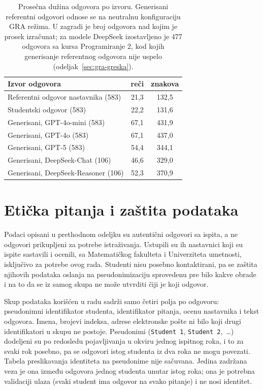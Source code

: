 \begin{table}[ht]
\centering
\caption{Prosečna dužina odgovora po izvoru.
Generisani referentni odgovori odnose se na neutralnu konfiguraciju GRA režima.
U zagradi je broj odgovora nad kojim je prosek izračunat;
za modele DeepSeek izostavljeno je 477 odgovora sa kursa Programiranje 2,
kod kojih generisanje referentnog odgovora nije uspelo (odeljak~\ref{sec:gra-greska}).}
\label{tab:response_length}
\begin{tabular}{lcc}
\toprule
\textbf{Izvor odgovora} & \textbf{reči} & \textbf{znakova} \\
\midrule
Referentni odgovor nastavnika (583) & 21{,}3 & 132{,}5 \\
Studentski odgovor (583) & 22{,}2 & 131{,}6 \\
\midrule
Generisani, GPT-4o-mini (583) & 67{,}1 & 431{,}9 \\
Generisani, GPT-4o (583) & 67{,}1 & 437{,}0 \\
Generisani, GPT-5 (583) & 54{,}4 & 344{,}1 \\
Generisani, DeepSeek-Chat (106) & 46{,}6 & 329{,}0 \\
Generisani, DeepSeek-Reasoner (106) & 52{,}3 & 370{,}9 \\
\bottomrule
\end{tabular}
\end{table}

\section{Etička pitanja i zaštita podataka}
\label{sec:etika}

Podaci opisani u prethodnom odeljku su autentični odgovori sa ispita, a ne odgovori prikupljeni za potrebe istraživanja.
Ustupili su ih nastavnici koji su ispite sastavili i ocenili, sa Matematičkog fakulteta i Univerziteta umetnosti,
isključivo za potrebe ovog rada.
Studenti nisu posebno kontaktirani,
pa se zaštita njihovih podataka oslanja na pseudonimizaciju sprovedenu pre bilo kakve obrade
i na to da se iz samog skupa ne može utvrditi čiji je koji odgovor.

Skup podataka korišćen u radu sadrži samo četiri polja po odgovoru:
pseudonimni identifikator studenta, identifikator pitanja, \mbox{ocenu} nastavnika i tekst odgovora.
Imena, brojevi indeksa, adrese elektronske pošte ni bilo koji drugi identifikatori u skupu ne postoje.
Pseudonimi (\texttt{Student~1}, \texttt{Student~2},~\dots) dodeljeni su po redosledu pojavljivanja u okviru jednog ispitnog roka,
i to za svaki rok posebno,
pa se odgovori istog studenta iz dva roka ne mogu povezati.
Tabela preslikavanja identiteta na pseudonime nije sačuvana.
Jedina zadržana veza je ona između odgovora jednog studenta unutar istog roka;
ona je potrebna validaciji ulaza (svaki student ima odgovor na svako pitanje) i ne nosi identitet.

